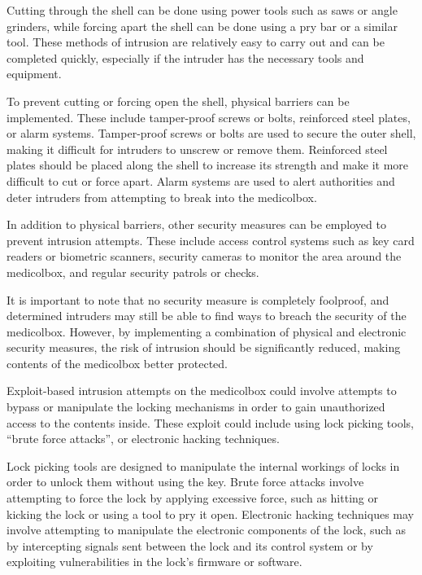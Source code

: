 \documentclass[../main.tex]{subfiles}
\begin{document}
Cutting through the shell can be done using power tools such as
saws or angle grinders, while forcing apart the shell
can be done using a pry bar or a similar tool.
These methods of \gls{intrusion} are relatively easy to carry out
and can be completed quickly,
especially if the intruder has the necessary tools and equipment.

To prevent cutting or forcing open the shell,
physical barriers can be implemented.
These include tamper-proof screws or bolts,
reinforced steel plates, or alarm systems.
Tamper-proof screws or bolts are used to secure the outer shell,
making it difficult for intruders to unscrew or remove them.
Reinforced steel plates should be placed along the shell to
increase its strength and make it more difficult to cut or force apart.
Alarm systems are used to alert authorities and deter
intruders from attempting to break into the \gls{medicolbox}.

In addition to physical barriers,
other security measures can be employed to prevent \gls{intrusion} attempts.
These include access control systems such as key card readers
or biometric scanners,
security cameras to monitor the area around the \gls{medicolbox},
and regular security patrols or checks.

It is important to note that no security measure is completely foolproof,
and determined intruders may still be able to find
ways to breach the security of the \gls{medicolbox}.
However, by implementing a combination of
physical and electronic security measures,
the risk of \gls{intrusion} should be significantly reduced,
making contents of the \gls{medicolbox} better protected.

Exploit-based \gls{intrusion} attempts on the \gls{medicolbox} could involve
attempts to bypass or manipulate the locking mechanisms
in order to gain unauthorized access to the contents inside.
These \gls{exploit} could include using lock picking tools,
\enquote{brute force attacks}, or electronic hacking techniques.

Lock picking tools are designed to manipulate the internal workings
of locks in order to unlock them without using the key.
Brute force attacks involve attempting to force the lock
by applying excessive force, such as hitting
or kicking the lock or using a tool to pry it open.
Electronic hacking techniques may involve attempting to manipulate
the electronic components of the lock,
such as by intercepting signals sent between the
lock and its control system
or by exploiting vulnerabilities in the lock's firmware or software.
\end{document}

